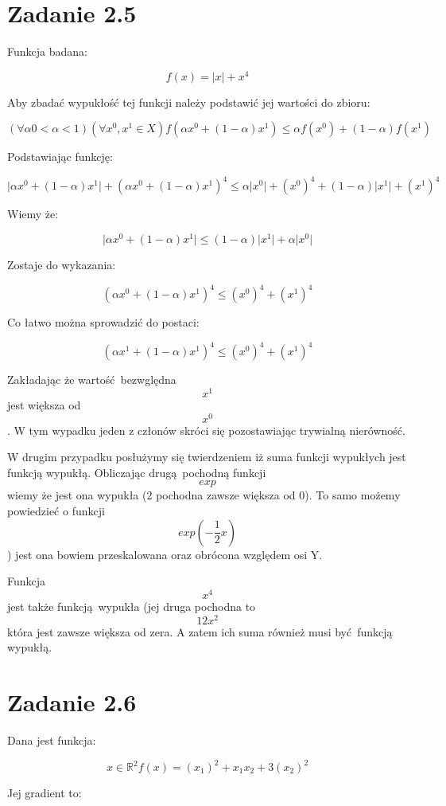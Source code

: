 \documentclass[paper=a4, fontsize=11pt]{scrartcl} %
\begin{document}
\section{Zadanie 2.5}

Funkcja badana:

\[f(x)=\mathopen|x\mathclose|+ x^4\]

Aby zbadać wypukłość tej funkcji należy podstawić jej wartości do zbioru:

\[(\forall \alpha 0<\alpha<1) (\forall x^0, x^1 \in X) f(\alpha x^0+(1-\alpha)x^1)\leq\alpha f(x^0)+(1-\alpha)f(x^1)\]

Podstawiając funkcję:

\[\mathopen|\alpha x^0 + (1 - \alpha)x^1\mathclose|+ (\alpha x^0+(1-\alpha)x^1)^4 \leq\alpha \mathopen|x^0\mathclose|+ (x^0)^4+(1-\alpha)\mathopen|x^1\mathclose|+ (x^1)^4\]

Wiemy że:

\[\mathopen|\alpha x^0 + (1 - \alpha)x^1\mathclose| \leq (1-\alpha)\mathopen|x^1\mathclose| + \alpha\mathopen|x^0\mathclose|\]

Zostaje do wykazania:

\[(\alpha x^0+(1-\alpha)x^1)^4 \leq(x^0)^4+ (x^1)^4\]

Co łatwo można sprowadzić do postaci:

\[(\alpha x^1+(1-\alpha)x^1)^4 \leq(x^0)^4+ (x^1)^4\]

Zakładając że wartość bezwględna \[x^1\] jest większa od \[x^0\].
W tym wypadku jeden z członów skróci się pozostawiając trywialną nierówność.

W drugim przypadku posłużymy się twierdzeniem iż suma funkcji wypukłych jest funkcją wypukłą.
Obliczając drugą pochodną funkcji \[exp\] wiemy że jest ona wypukła (2 pochodna zawsze większa od 0).
To samo możemy powiedzieć o funkcji \[exp(-\frac{1}{2}x)\]) jest ona bowiem przeskalowana oraz obrócona względem osi Y.

Funkcja \[x^4\] jest także funkcją wypukła (jej druga pochodna to \[12x^2\] która jest zawsze większa od zera.
A zatem ich suma również musi być funkcją wypukłą.
\newpage
\section{Zadanie 2.6}

Dana jest funkcja:

\[x\in\mathbb{R}^2f(x)=(x_1)^2+x_1x_2+3(x_2)^2\]

Jej gradient to:
\end{document}
